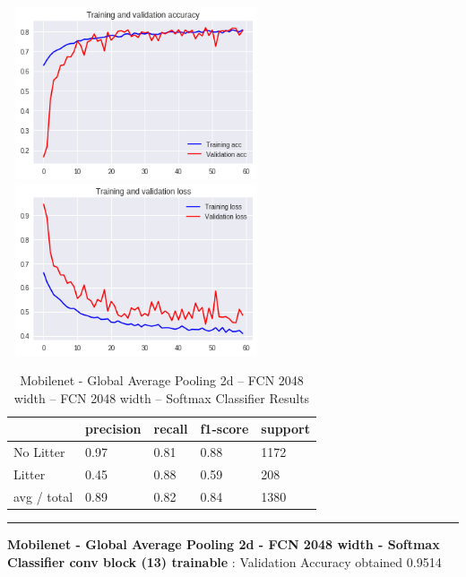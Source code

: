\documentclass{IEEEtran}
\begin{document}
 \includegraphics[width=3in,height=2in]{mobilenet-img/mobilenet-img011.png} 
\includegraphics[width=3in,height=2in]{mobilenet-img/mobilenet-img012.png} 

\begin{table}[ht]
\centering
\caption{Mobilenet - Global Average Pooling 2d -- FCN 2048 width -- FCN 2048 width -- Softmax Classifier Results}
\begin{tabular}{|l|l|l|l|l|} 
\hline
 & precision & recall  & f1-score  & support \\\hline
No Litter &
0.97 &
0.81 &
0.88 &
1172 \\\hline
Litter &
0.45 &
0.88 &
0.59 &
208 \\\hline
avg / total &
0.89 &
0.82 &
0.84 &
1380\\\hline
\end{tabular}
\end{table}

\begin{center}\noindent\rule{8cm}{0.4pt}\end{center}

\textbf{Mobilenet - Global Average Pooling 2d - FCN 2048 width - Softmax Classifier conv block (13) trainable }: Validation Accuracy obtained 0.9514
\end{document}
